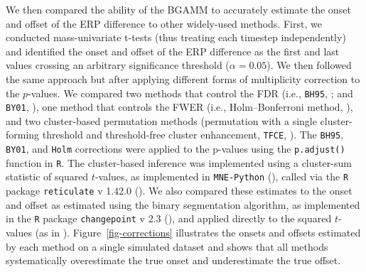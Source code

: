 \documentclass[
  doc,
  floatsintext,
  longtable,
  a4paper,
  nolmodern,
  notxfonts,
  notimes,
  donotrepeattitle,
  colorlinks=true,linkcolor=blue,citecolor=blue,urlcolor=blue]{apa7}
\begin{document}
We then compared the ability of the BGAMM to accurately estimate the
onset and offset of the ERP difference to other widely-used methods.
First, we conducted mass-univariate t-tests (thus treating each timestep
independently) and identified the onset and offset of the ERP difference
as the first and last values crossing an arbitrary significance
threshold (\(\alpha = 0.05\)). We then followed the same approach but
after applying different forms of multiplicity correction to the
\(p\)-values. We compared two methods that control the FDR (i.e.,
\texttt{BH95}, ; and \texttt{BY01}, ), one method that controls the FWER (i.e.,
Holm--Bonferroni method, ), and two
cluster-based permutation methods (permutation with a single
cluster-forming threshold and threshold-free cluster enhancement,
\texttt{TFCE}, ). The
\texttt{BH95}, \texttt{BY01}, and \texttt{Holm} corrections were applied
to the p-values using the \texttt{p.adjust()} function in \texttt{R}.
The cluster-based inference was implemented using a cluster-sum
statistic of squared \(t\)-values, as implemented in \texttt{MNE-Python}
(), called via the \texttt{R}
package \texttt{reticulate} v 1.42.0 (). We also compared these estimates to the onset and offset as
estimated using the binary segmentation algorithm, as implemented in the
\texttt{R} package \texttt{changepoint} v 2.3
(), and applied directly
to the squared \(t\)-values (as in
).
Figure~\ref{fig-corrections} illustrates the onsets and offsets
estimated by each method on a single simulated dataset and shows that
all methods systematically overestimate the true onset and underestimate
the true offset.
\end{document}
